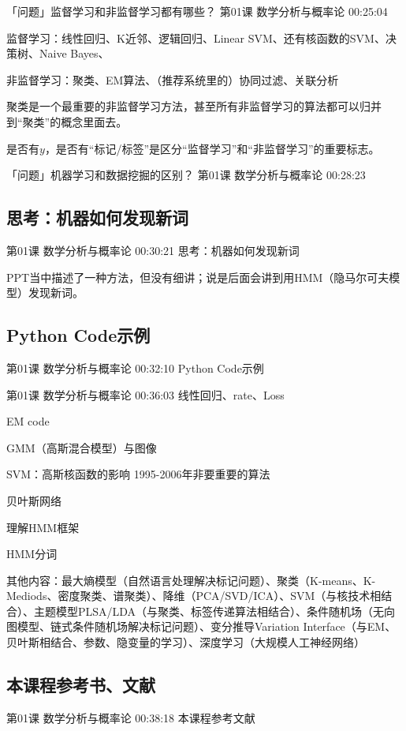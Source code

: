 \documentclass[UTF8]{ctexart}
\begin{document}
「问题」监督学习和非监督学习都有哪些？ 第01课 数学分析与概率论 00:25:04

监督学习：线性回归、K近邻、逻辑回归、Linear SVM、还有核函数的SVM、决策树、Naive Bayes、

非监督学习：聚类、EM算法、（推荐系统里的）协同过滤、关联分析

聚类是一个最重要的非监督学习方法，甚至所有非监督学习的算法都可以归并到“聚类”的概念里面去。

是否有$y$，是否有“标记/标签”是区分“监督学习”和“非监督学习”的重要标志。

「问题」机器学习和数据挖掘的区别？ 第01课 数学分析与概率论 00:28:23


\subsection{思考：机器如何发现新词}

第01课 数学分析与概率论 00:30:21 思考：机器如何发现新词

PPT当中描述了一种方法，但没有细讲；说是后面会讲到用HMM（隐马尔可夫模型）发现新词。

\subsection{Python Code示例}

第01课 数学分析与概率论 00:32:10 Python Code示例

第01课 数学分析与概率论 00:36:03 线性回归、rate、Loss

EM code

GMM（高斯混合模型）与图像

SVM：高斯核函数的影响        1995-2006年非要重要的算法

贝叶斯网络 

理解HMM框架

HMM分词

其他内容：最大熵模型（自然语言处理解决标记问题）、聚类（K-means、K-Mediods、密度聚类、谱聚类）、降维（PCA/SVD/ICA）、SVM（与核技术相结合）、主题模型PLSA/LDA（与聚类、标签传递算法相结合）、条件随机场（无向图模型、链式条件随机场解决标记问题）、变分推导Variation Interface（与EM、贝叶斯相结合、参数、隐变量的学习）、深度学习（大规模人工神经网络）

\subsection{本课程参考书、文献}

第01课 数学分析与概率论 00:38:18 本课程参考文献
\end{document}
